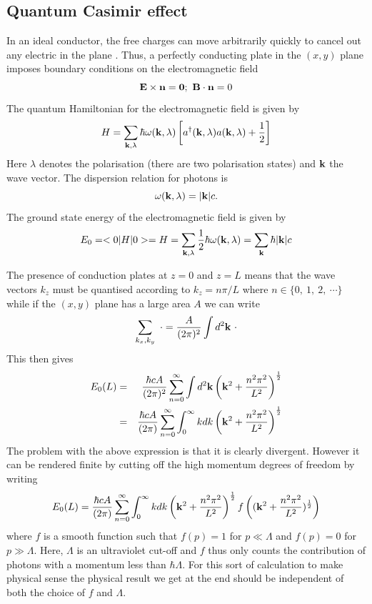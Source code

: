 \subsection{Quantum Casimir effect}
In an ideal conductor, the free charges can move arbitrarily quickly to cancel out any electric in the plane \cite{richard_feynman_feynman_1963}. Thus, a perfectly conducting plate in the $(x,y)$ plane imposes boundary conditions on the electromagnetic field
\begin{equation}
{\bf E}\times {\bf n} = {\bf 0};\ {\bf B}\cdot {\bf n} = 0
\end{equation}
The quantum Hamiltonian for the electromagnetic field is given by 
\begin{equation}
H = \sum_{{\bf k},\lambda}\hbar \omega({\bf k},\lambda)\left[a^\dagger({\bf k},\lambda)a({\bf k},\lambda) + {1\over 2}\right]
\end{equation}
Here $\lambda$ denotes the polarisation (there are two polarisation states) and ${\bf k}$ the wave vector. The dispersion 
relation for photons is
\begin{equation}
\omega({\bf k},\lambda) = |{\bf k}|c.
\end{equation}
The ground state energy of the electromagnetic field \cite{h_b_g_casimir_attraction_1948} is given by
\begin{equation}
E_0 = < 0|H|0> = H = \sum_{{\bf k},\lambda}{1\over 2}\hbar \omega({\bf k},\lambda)= \sum_{\bf k}\hbar |{\bf k}|c
\end{equation}

The presence of conduction plates at $z=0$ and $z=L$ means that the wave vectors $k_z$
must be quantised according to $k_z= n\pi/L$ where $n \in \{0,\ 1, \ 2, \ \cdots\}$ while
if the $(x,y)$ plane has a large area $A$ we can write
\begin{equation}
\sum_{k_x,k_y}\ \cdot= {A\over (2\pi)^2}\int d^2{\bf k} \ \cdot
\end{equation}
This then gives 
\begin{eqnarray}
E_0(L) &=& {\hbar c A\over (2\pi)^2}\sum_{n=0}^\infty \int d^2{\bf k} \left({\bf k}^2 + {n^2\pi^2\over L^2}\right)^{1\over 2} \\
&=& {\hbar c A\over (2\pi)}\sum_{n=0}^\infty \int_0^\infty kdk \left({\bf k}^2 + {n^2\pi^2\over L^2}\right)^{1\over 2}
\end{eqnarray}
The problem with the above expression is that it is clearly divergent. However it can be rendered finite by cutting off the high momentum degrees of freedom by writing
\begin{equation}
E_0(L) = {\hbar c A\over (2\pi)}\sum_{n=0}^\infty \int_0^\infty kdk \left({\bf k}^2 + {n^2\pi^2\over L^2}\right)^{1\over 2} f\left(({\bf k}^2 + {n^2\pi^2\over L^2})^{1\over 2}\right)
\end{equation}
where $f$ is a smooth function such that $f(p)=1$ for $p\ll\Lambda$ and $f(p)=0$ for $p\gg\Lambda$. Here, $\Lambda$ is an ultraviolet cut-off and $f$ thus only counts the contribution of photons with a momentum less than $\hbar\Lambda$. For this sort of calculation to make physical sense the physical result we get at the end should be independent of both the choice of $f$ and $\Lambda$. 




